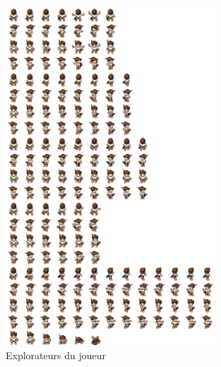 \documentclass[a4paper,12pt]{article}
\begin{document}
\begin{figure}[H]
\begin{center}
  \includegraphics[width=0.7\textwidth]{images/Settlers_Gold.png}
  \caption{Explorateurs du joueur}
 \end{center}
\end{figure}
\end{document}
